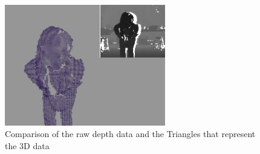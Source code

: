 \documentclass[12pt,twocolumn]{article}
\begin{document}
\begin{figure}[H]
\centering
\includegraphics[width=70mm]{cadyholdingball2.png}
\caption{Comparison of the raw depth data and the Triangles that represent the 3D data}
\label{balls2}
\end{figure}
\end{document}
